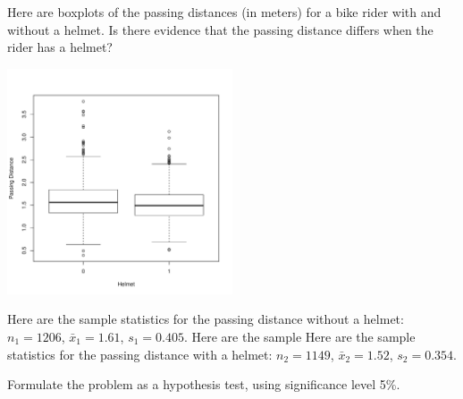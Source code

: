 \documentclass[11pt]{exam}
\begin{document}
\begin{questions}


\newpage




\question Here are boxplots of the passing distances (in meters) for a bike
rider with and without a helmet.  Is there evidence that the passing distance
differs when the rider has a helmet?
\begin{center}
\includegraphics[width=0.5\textwidth]{passing-by-helmet}
\end{center}
Here are the sample statistics for the passing distance without a helmet:
$n_1 = 1206$, $\bar x_1 = 1.61$, $s_1 = 0.405$.  Here are the sample
Here are the sample statistics for the passing distance with a helmet:
$n_2 = 1149$, $\bar x_2 = 1.52$, $s_2 = 0.354$.

Formulate the problem as a hypothesis test, using significance level 5\%.


\end{questions}
\end{document}
